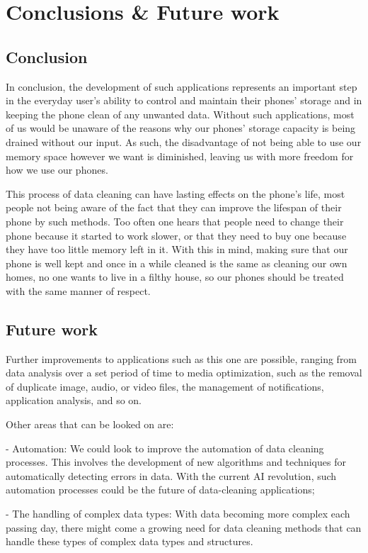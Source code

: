 
\chapter{Conclusions \& Future work }\label{chapter:chap6}

\section{Conclusion}\label{sect:Conclusion}

In conclusion, the development of such applications represents an important step in the everyday user's ability to control and maintain their phones' storage and in keeping the phone clean of any unwanted data. Without such applications, most of us would be unaware of the reasons why our phones' storage capacity is being drained without our input. As such, the disadvantage of not being able to use our memory space however we want is diminished, leaving us with more freedom for how we use our phones.

This process of data cleaning can have lasting effects on the phone's life, most people not being aware of the fact that they can improve the lifespan of their phone by such methods. Too often one hears that people need to change their phone because it started to work slower, or that they need to buy one because they have too little memory left in it. With this in mind, making sure that our phone is well kept and once in a while cleaned is the same as cleaning our own homes, no one wants to live in a filthy house, so our phones should be treated with the same manner of respect.

\section{Future work}\label{sect:Future work}

Further improvements to applications such as this one are possible, ranging from data analysis over a set period of time to media optimization, such as the removal of duplicate image, audio, or video files, the management of notifications, application analysis, and so on.

Other areas that can be looked on are:

- Automation: We could look to improve the automation of data cleaning processes. This involves the development of new algorithms and techniques for automatically detecting errors in data. With the current \ac{AI} revolution, such automation processes could be the future of data-cleaning applications;

- The handling of complex data types: With data becoming more complex each passing day, there might come a growing need for data cleaning methods that can handle these types of complex data types and structures. 